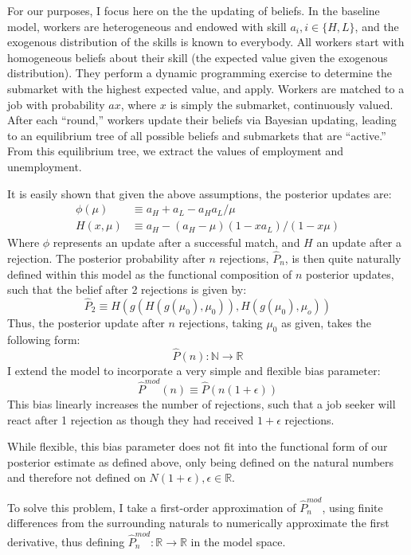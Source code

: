 \documentclass[a4paper,12pt]{article}
\begin{document}
For our purposes, I focus here on the the updating of beliefs. In the baseline model, workers are heterogeneous and endowed with skill $a_i, i \in \{ H, L \}$, and the exogenous distribution of the skills is known to everybody. All workers start with homogeneous beliefs about their skill (the expected value given the exogenous distribution). They perform a dynamic programming exercise to determine the submarket with the highest expected value, and apply. Workers are matched to a job with probability $ax$, where $x$ is simply the submarket, continuously valued. After each ``round,'' workers update their beliefs via Bayesian updating, leading to an equilibrium tree of all possible beliefs and submarkets that are ``active.'' From this equilibrium tree, we extract the values of employment and unemployment.

It is easily shown that given the above assumptions, the posterior updates are:
%
\begin{align*}
  \phi(\mu) &\equiv  a_H + a_L - a_Ha_L/\mu \\
  H(x, \mu) &\equiv a_H - (a_H - \mu)(1 - xa_L)/(1 - x\mu)
\end{align*}
%
Where $\phi$ represents an update after a successful match, and $H$ an update after a rejection. The posterior probability after $n$ rejections, $\hat{P}_n$, is then quite naturally defined within this model as the functional composition of $n$ posterior updates, such that the belief after 2 rejections is given by:
$$
\hat{P}_2 \equiv H(g(H(g(\mu_0), \mu_0)), H(g(\mu_0),\mu_o))
$$
Thus, the posterior update after $n$ rejections, taking $\mu_0$ as given, takes the following form:
%
$$
\hat{P}(n): \mathbb{N} \rightarrow \mathbb{R}
$$
%
I extend the model to incorporate a very simple and flexible bias parameter:
%
$$
\hat{P}^{mod}(n) \equiv \hat{P} (n(1 + \epsilon))
$$
This bias linearly increases the number of rejections, such that a job seeker will react after 1 rejection as though they had received $1 + \epsilon$ rejections.

While flexible, this bias parameter does not fit into the functional form of our posterior estimate as defined above, only being defined on the natural numbers and therefore not defined on $N(1 + \epsilon), \epsilon \in \mathbb{R}$.

To solve this problem, I take a first-order approximation of $\hat{P}^{mod}_n$, using finite differences from the surrounding naturals to numerically approximate the first derivative, thus defining $\hat{P}^{mod}_n: \mathbb{R} \rightarrow \mathbb{R}$ in the model space.
\end{document}
